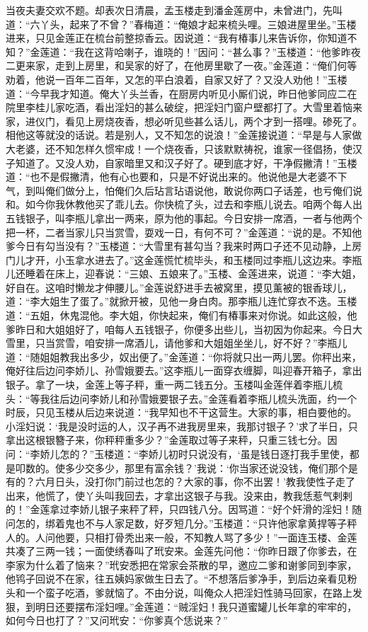 当夜夫妻交欢不题。却表次日清晨，孟玉楼走到潘金莲房中，未曾进门，先叫道：“六丫头，起来了不曾？”春梅道：“俺娘才起来梳头哩。三娘进屋里坐。”玉楼进来，只见金莲正在梳台前整掠香云。因说道：“我有椿事儿来告诉你，你知道不知？”金莲道：“我在这背哈喇子，谁晓的！”因问：“甚么事？”玉楼道：“他爹昨夜二更来家，走到上房里，和吴家的好了，在他房里歇了一夜。”金莲道：“俺们何等劝着，他说一百年二百年，又怎的平白浪着，自家又好了？又没人劝他！”玉楼道：“今早我才知道。俺大丫头兰香，在厨房内听见小厮们说，昨日他爹同应二在院里李桂儿家吃酒，看出淫妇的甚么破绽，把淫妇门窗户壁都打了。大雪里着恼来家，进仪门，看见上房烧夜香，想必听见些甚么话儿，两个才到一搭哩。碜死了。相他这等就没的话说。若是别人，又不知怎的说浪！”金莲接说道：“早是与人家做大老婆，还不知怎样久惯牢成！一个烧夜香，只该默默祷祝，谁家一径倡扬，使汉子知道了。又没人劝，自家暗里又和汉子好了。硬到底才好，干净假撇清！”玉楼道：“也不是假撇清，他有心也要和，只是不好说出来的。他说他是大老婆不下气，到叫俺们做分上，怕俺们久后玷言玷语说他，敢说你两口子话差，也亏俺们说和。如今你我休教他买了乖儿去。你快梳了头，过去和李瓶儿说去。咱两个每人出五钱银子，叫李瓶儿拿出一两来，原为他的事起。今日安排一席酒，一者与他两个把一杯，二者当家儿只当赏雪，耍戏一日，有何不可？”金莲道：“说的是。不知他爹今日有勾当没有？”玉楼道：“大雪里有甚勾当？我来时两口子还不见动静，上房门儿才开，小玉拿水进去了。”这金莲慌忙梳毕头，和玉楼同过李瓶儿这边来。李瓶儿还睡着在床上，迎春说：“三娘、五娘来了。”玉楼、金莲进来，说道：“李大姐，好自在。这咱时懒龙才伸腰儿。”金莲说舒进手去被窝里，摸见薰被的银香球儿，道：“李大姐生了蛋了。”就掀开被，见他一身白肉。那李瓶儿连忙穿衣不迭。玉楼道：“五姐，休鬼混他。李大姐，你快起来，俺们有椿事来对你说。如此这般，他爹昨日和大姐姐好了，咱每人五钱银子，你便多出些儿，当初因为你起来。今日大雪里，只当赏雪，咱安排一席酒儿，请他爹和大姐姐坐坐儿，好不好？”李瓶儿道：“随姐姐教我出多少，奴出便了。”金莲道：“你将就只出一两儿罢。你秤出来，俺好往后边问李娇儿、孙雪娥要去。”这李瓶儿一面穿衣缠脚，叫迎春开箱子，拿出银子。拿了一块，金莲上等子秤，重一两二钱五分。玉楼叫金莲伴着李瓶儿梳头：“等我往后边问李娇儿和孙雪娥要银子去。”金莲看着李瓶儿梳头洗面，约一个时辰，只见玉楼从后边来说道：“我早知也不干这营生。大家的事，相白要他的。小淫妇说：‘我是没时运的人，汉子再不进我房里来，我那讨银子？’求了半日，只拿出这根银簪子来，你秤秤重多少？”金莲取过等子来秤，只重三钱七分。因问：“李娇儿怎的？”玉楼道：“李娇儿初时只说没有，‘虽是钱日逐打我手里使，都是叩数的。使多少交多少，那里有富余钱？’我说：‘你当家还说没钱，俺们那个是有的？六月日头，没打你门前过也怎的？大家的事，你不出罢！’教我使性子走了出来，他慌了，使丫头叫我回去，才拿出这银子与我。没来由，教我恁惹气剌剌的！”金莲拿过李娇儿银子来秤了秤，只四钱八分。因骂道：“好个奸滑的淫妇！随问怎的，绑着鬼也不与人家足数，好歹短几分。”玉楼道：“只许他家拿黄捍等子秤人的。人问他要，只相打骨秃出来一般，不知教人骂了多少！”一面连玉楼、金莲共凑了三两一钱；一面使绣春叫了玳安来。金莲先问他：“你昨日跟了你爹去，在李家为什么着了恼来？”玳安悉把在常家会茶散的早，邀应二爹和谢爹同到李家，他鸨子回说不在家，往五姨妈家做生日去了。“不想落后爹净手，到后边亲看见粉头和一个蛮子吃酒，爹就恼了。不由分说，叫俺众人把淫妇性骑马回家，在路上发狠，到明日还要摆布淫妇哩。”金莲道：“贼淫妇！我只道蜜罐儿长年拿的牢牢的，如何今日也打了？”又问玳安：“你爹真个恁说来？”